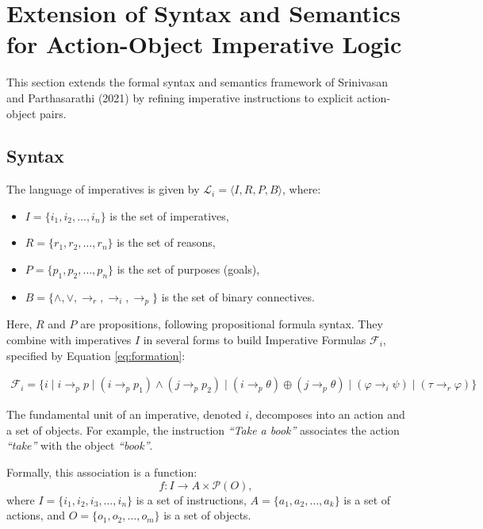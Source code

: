 \documentclass[a4paper,11pt]{lmcs}
\begin{document}
\section{Extension of Syntax and Semantics for Action-Object Imperative Logic}
This section extends the formal syntax and semantics framework of Srinivasan and Parthasarathi (2021) \cite{mira} by refining imperative instructions to explicit action-object pairs.
\subsection{Syntax}
\label{sec:syntax}
The language of imperatives is given by \(\mathcal{L}_i = \langle I, R, P, B \rangle\), where:
\begin{itemize}
  \item \(I = \{ i_1, i_2, \ldots, i_n \}\) is the set of imperatives,
  \item \(R = \{ r_1, r_2, \ldots, r_n \}\) is the set of reasons,
  \item \(P = \{ p_1, p_2, \ldots, p_n \}\) is the set of purposes (goals),
  \item \(B = \{ \wedge, \vee, \rightarrow_r, \rightarrow_i, \rightarrow_p \}\) is the set of binary connectives.
\end{itemize}

Here, \(R\) and \(P\) are propositions, following propositional formula syntax. They combine with imperatives \(I\) in several forms to build Imperative Formulas \(\mathcal{F}_i\), specified by Equation \ref{eq:formation}:

\begin{eqnarray}
\label{eq:formation}
\mathcal{F}_i = \{
i \mid i \rightarrow_p p \mid (i \rightarrow_p p_1) \wedge (j \rightarrow_p p_2) \mid (i \rightarrow_p \theta) \oplus (j \rightarrow_p \theta) \mid (\varphi \rightarrow_i \psi) \mid (\tau \rightarrow_r \varphi)
\}
\end{eqnarray}

The fundamental unit of an imperative, denoted \(i\), decomposes into an action and a set of objects. For example, the instruction \emph{``Take a book''} associates the action \emph{``take''} with the object \emph{``book''}.

Formally, this association is a function:
\[
f : I \to A \times \mathcal{P}(O),
\]
where \(I = \{ i_1, i_2, i_3, \ldots, i_n \}\) is a set of instructions,
\(A = \{ a_1, a_2, \ldots, a_k \}\) is a set of actions, and
\(O = \{ o_1, o_2, \ldots, o_m \}\) is a set of objects.
\end{document}
